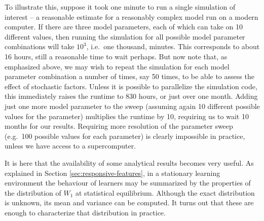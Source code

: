 To illustrate this, suppose it took one minute to run a single
simulation of interest -- a reasonable estimate for a reasonably complex
model run on a modern computer. If there are three model parameters,
each of which can take on 10 different values, then running the
simulation for all possible model parameter combinations will take
\(10^3\), i.e.~one thousand, minutes. This corresponds to about 16
hours, still a reasonable time to wait perhaps. But now note that, as
emphasized above, we may wish to repeat the simulation for each model
parameter combination a number of times, say 50 times, to be able to
assess the effect of stochastic factors. Unless it is possible to
parallelize the simulation code, this immediately raises the runtime to
830 hours, or just over one month. Adding just one more model parameter
to the sweep (assuming again 10 different possible values for the
parameter) multiplies the runtime by 10, requiring us to wait 10 months
for our results. Requiring more resolution of the parameter sweep
(e.g.~100 possible values for each parameter) is clearly impossible in
practice, unless we have access to a supercomputer.

It is here that the availability of some analytical results becomes very
useful. As explained in Section \ref{sec:responsive-features}, in a
stationary learning environment the behaviour of learners may be
summarized by the properties of the distribution of \(W_1\) at
statistical equilibrium. Although the exact distribution is unknown, its
mean and variance can be computed. It turns out that these are enough to
characterize that distribution in practice.

